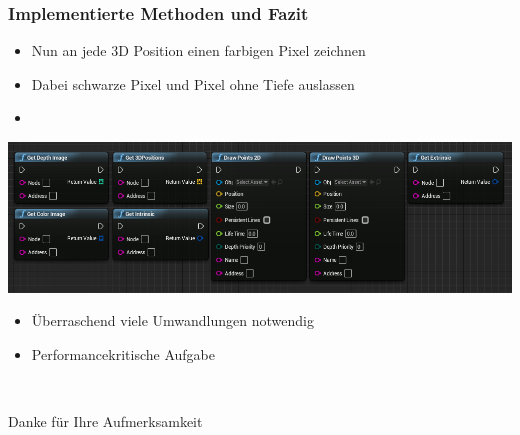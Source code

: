 \documentclass[18pt]{beamer}
\begin{document}
\begin{frame}
	\frametitle{Implementierte Methoden und Fazit} 
	\begin{itemize}
		\item Nun an jede 3D Position einen farbigen Pixel zeichnen
		\item Dabei schwarze Pixel und Pixel ohne Tiefe auslassen
		\item {}
	\end{itemize}
	\begin{center}
		\includegraphics[height=0.37\paperheight]{img/AllFunctionsBP}
	\end{center}
	\begin{itemize}
		\item Überraschend viele Umwandlungen notwendig
		\item Performancekritische Aufgabe

	\end{itemize}
\end{frame}


\begin{frame}{~}
	\begin{center}
		\huge{Danke für Ihre Aufmerksamkeit}
	\end{center}
\end{frame}
\end{document}
